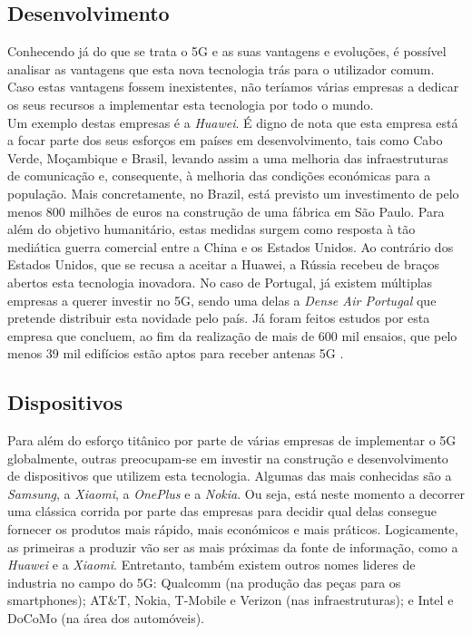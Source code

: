 \documentclass{llncs}
\begin{document}
\subsection{Desenvolvimento}
Conhecendo já do que se trata o 5G e as suas vantagens e evoluções,
é possível analisar as vantagens que esta nova tecnologia trás para
o utilizador comum.\\
Caso estas vantagens fossem inexistentes, não teríamos várias empresas
a dedicar os seus recursos a implementar esta tecnologia por todo o 
mundo.\\
Um exemplo destas empresas é a \textit{Huawei}.
É digno de nota que esta empresa está a focar parte dos seus esforços 
em países em desenvolvimento, tais como Cabo Verde, Moçambique e 
Brasil, levando assim a uma melhoria das infraestruturas de 
comunicação e, consequente, à melhoria das condições económicas para a
população. Mais concretamente, no Brazil, está previsto um
investimento de pelo menos 800 milhões de euros na construção de uma 
fábrica em São Paulo. Para além do objetivo humanitário, estas medidas
surgem como resposta à tão mediática guerra comercial entre a China e
os Estados Unidos.
Ao contrário dos Estados Unidos, que se recusa a aceitar a Huawei, a
Rússia recebeu de braços abertos esta tecnologia inovadora.
No caso de Portugal, já existem múltiplas empresas a querer investir
no 5G, sendo uma delas a \textit{Dense Air Portugal} que pretende
distribuir esta novidade pelo país.
Já foram feitos estudos por esta empresa que concluem, ao fim da
realização de mais de 600 mil ensaios, que pelo menos 39 mil edifícios
estão aptos para receber antenas 5G \cite{5GPortugal}.

\subsection{Dispositivos}
Para além do esforço titânico por parte de várias empresas de
implementar o 5G globalmente, outras preocupam-se em 
investir na construção e desenvolvimento de dispositivos que utilizem
esta tecnologia. Algumas das mais conhecidas são a \textit{Samsung}, a
\textit{Xiaomi}, a \textit{OnePlus} e a \textit{Nokia}.
Ou seja, está neste momento a decorrer uma clássica corrida por parte
das empresas para decidir qual delas consegue fornecer os produtos
mais rápido, mais económicos e mais práticos.
Logicamente, as primeiras a produzir vão ser as mais próximas da fonte
de informação, como a \textit{Huawei} e a \textit{Xiaomi}.
Entretanto, também existem outros nomes lideres de industria no campo 
do 5G: Qualcomm (na produção das peças para os smartphones);
AT\&T, Nokia, T-Mobile e Verizon (nas infraestruturas); e Intel e 
DoCoMo (na área dos automóveis). 
\end{document}
